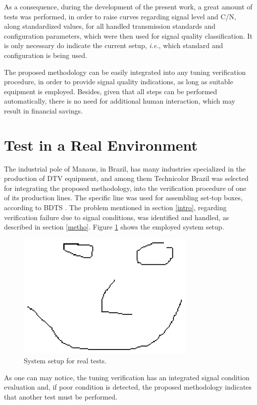 \documentclass[conference]{IEEEtran}
\begin{document}
As a consequence, during the development of the present work, a great amount of tests was performed, in order to raise curves regarding signal level and C/N, along standardized values, for all handled transmission standards and configuration parameters, which were then used for signal quality classification. It is only necessary do indicate the current setup, {\it i.e.}, which standard and configuration is being used.

The proposed methodology can be easily integrated into any tuning verification procedure, in order to provide signal quality indications, as long as suitable equipment is employed. Besides, given that all steps can be performed automatically, there is no need for additional human interaction, which may result in financial savings.

\section{Test in a Real Environment}

The industrial pole of Manaus, in Brazil, has many industries specialized in the production of DTV equipment, and among them Technicolor Brazil was selected for integrating the proposed methodology, into the verification procedure of one of its production lines. The specific line was used for assembling set-top boxes, according to BDTS \cite{sbtvd}. The problem mentioned in section \ref{intro}, regarding verification failure due to signal conditions, was identified and handled, as described in section \ref{metho}. Figure \ref{figure:fig1} shows the employed system setup.

\begin{figure}[ht]
\centerline{\includegraphics[width=3.4in]{Fig1.eps}}
\caption{System setup for real tests.}
\label{figure:fig1}
\end{figure}

As one can may notice, the tuning verification has an integrated signal condition evaluation and, if poor condition is detected, the proposed methodology indicates that another test must be performed. 
\end{document}

